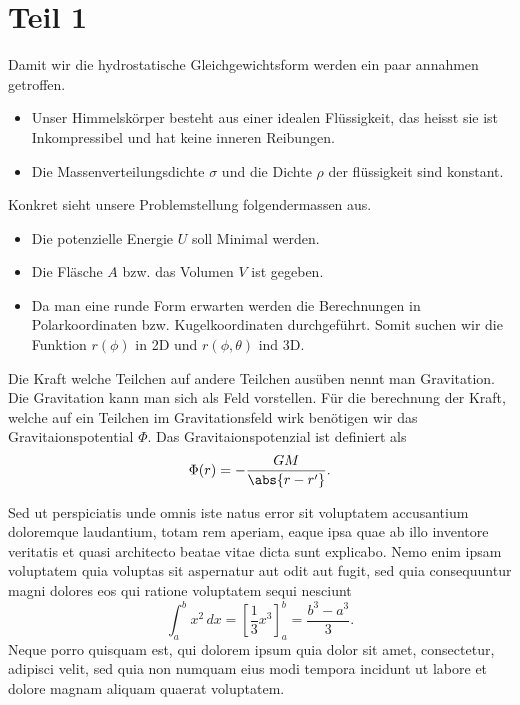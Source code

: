 %
%
%
%
\section{Teil 1
\label{planet:section:teil1}}
Damit wir die hydrostatische Gleichgewichtsform werden ein paar annahmen getroffen.
\begin{itemize}
	\item Unser Himmelskörper besteht aus einer idealen Flüssigkeit, das heisst sie ist Inkompressibel und hat keine inneren Reibungen.
	\item Die Massenverteilungsdichte \(\sigma\) und die Dichte \(\rho\) der flüssigkeit sind konstant.	
\end{itemize}

Konkret sieht unsere Problemstellung folgendermassen aus.
\begin{itemize}
	\item Die potenzielle Energie \(U\) soll Minimal werden.
	\item Die Fläsche \(A\) bzw. das Volumen \(V\) ist gegeben.
	\item Da man eine runde Form erwarten werden die Berechnungen in Polarkoordinaten bzw. Kugelkoordinaten durchgeführt. Somit suchen wir die Funktion \(r(\phi)\) in 2D und \(r(\phi,\theta)\) ind 3D.
\end{itemize}

Die Kraft welche Teilchen auf andere Teilchen ausüben nennt man Gravitation.
Die Gravitation kann man sich als Feld vorstellen.
Für die berechnung der Kraft, welche auf ein Teilchen im Gravitationsfeld wirk benötigen wir das Gravitaionspotential \(\Phi\).
Das Gravitaionspotenzial ist definiert als
\begin{equation}
	\Phi(r) = -\frac{GM}{\abs{r-r'}}.
\end{equation}


Sed ut perspiciatis unde omnis iste natus error sit voluptatem
accusantium doloremque laudantium, totam rem aperiam, eaque ipsa
quae ab illo inventore veritatis et quasi architecto beatae vitae
dicta sunt explicabo.
Nemo enim ipsam voluptatem quia voluptas sit aspernatur aut odit
aut fugit, sed quia consequuntur magni dolores eos qui ratione
voluptatem sequi nesciunt
\begin{equation}
\int_a^b x^2\, dx
=
\left[ \frac13 x^3 \right]_a^b
=
\frac{b^3-a^3}3.
\label{planet:equation1}
\end{equation}
Neque porro quisquam est, qui dolorem ipsum quia dolor sit amet,
consectetur, adipisci velit, sed quia non numquam eius modi tempora
incidunt ut labore et dolore magnam aliquam quaerat voluptatem.

